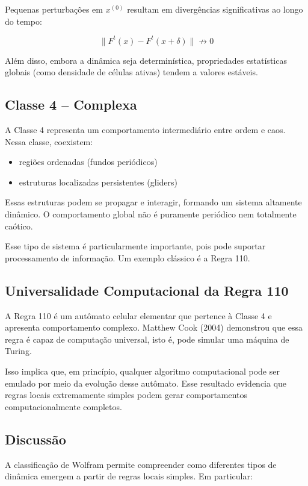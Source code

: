 Pequenas perturbações em $x^{(0)}$ resultam em divergências significativas ao longo do tempo:

\[
\| F^t(x) - F^t(x + \delta) \| \not\to 0
\]

Além disso, embora a dinâmica seja determinística, propriedades estatísticas globais (como densidade de células ativas) tendem a valores estáveis.

\subsection{Classe 4 -- Complexa}

A Classe 4 representa um comportamento intermediário entre ordem e caos. Nessa classe, coexistem:

\begin{itemize}
    \item regiões ordenadas (fundos periódicos)
    \item estruturas localizadas persistentes (gliders)
\end{itemize}

Essas estruturas podem se propagar e interagir, formando um sistema altamente dinâmico. O comportamento global não é puramente periódico nem totalmente caótico.

Esse tipo de sistema é particularmente importante, pois pode suportar processamento de informação. Um exemplo clássico é a Regra 110.

\subsection{Universalidade Computacional da Regra 110}

A Regra 110 é um autômato celular elementar que pertence à Classe 4 e apresenta comportamento complexo. Matthew Cook (2004) demonstrou que essa regra é capaz de computação universal, isto é, pode simular uma máquina de Turing.

Isso implica que, em princípio, qualquer algoritmo computacional pode ser emulado por meio da evolução desse autômato. Esse resultado evidencia que regras locais extremamente simples podem gerar comportamentos computacionalmente completos.

\subsection{Discussão}

A classificação de Wolfram permite compreender como diferentes tipos de dinâmica emergem a partir de regras locais simples. Em particular:

